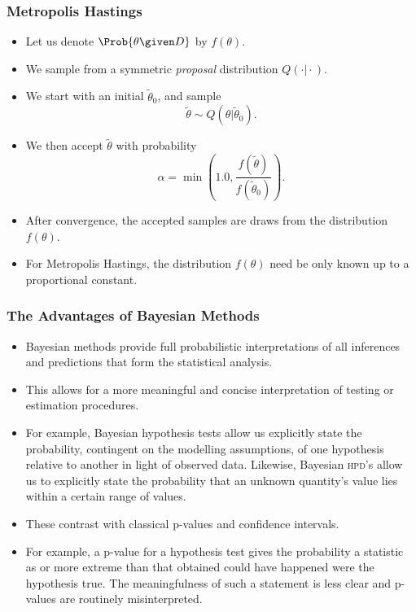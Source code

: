 \documentclass{slides}
\begin{document}
\begin{frame}
	\frametitle{Metropolis Hastings}
	\begin{itemize}	
		\item Let us denote $\Prob{\theta\given D}$ by $f(\theta)$.
		\item We sample from a symmetric \emph{proposal} distribution $Q(\cdot\vert\cdot)$.
		\item We start with an initial $\tilde{\theta}_0$, and sample 
			\[\tilde{\theta} \sim Q(\theta\vert\tilde{\theta}_0).\]
		\item We then accept $\tilde{\theta}$ with probability 
			\[\alpha = \min\left(1.0, \frac{f(\tilde{\theta})}{f(\tilde{\theta}_0)}\right).\]
		\item After convergence, the accepted samples are draws from the distribution $f(\theta)$.
		\item For Metropolis Hastings, the distribution $f(\theta)$ need be only known up to a proportional constant.
	\end{itemize}
\end{frame}

\begin{frame}
	\frametitle{The Advantages of Bayesian Methods}
	\begin{itemize}	
		\item Bayesian methods provide full probabilistic interpretations of all inferences
and predictions that form the statistical analysis. 
\item This allows for a more meaningful and concise interpretation of testing or estimation procedures.  
\item For example, Bayesian hypothesis
tests allow us explicitly state the probability, contingent on the modelling
assumptions, of one hypothesis relative to another in light of observed data.
Likewise, Bayesian \textsc{hpd}'s allow us to explicitly state the probability
that an unknown quantity's value lies within a certain range of values. 
\item These contrast with classical p-values and
confidence intervals.  
\item For example, a p-value for a hypothesis test gives the
probability a statistic as or more extreme than that obtained could have
happened were the hypothesis true. The meaningfulness of such a statement is
less clear and p-values are
routinely misinterpreted. 
	\end{itemize}
\end{frame}
\end{document}
